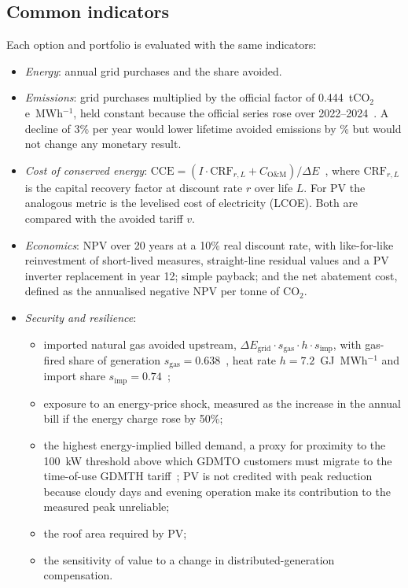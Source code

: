 \documentclass[processes,article,submit,pdftex,moreauthors]{Definitions/mdpi}
\begin{document}
\subsection{Common indicators}
\label{sec:indicators}
Each option and portfolio is evaluated with the same indicators:
\begin{itemize}
\item \emph{Energy}: annual grid purchases and the share avoided.
\item \emph{Emissions}: grid purchases multiplied by the official factor of 0.444~tCO$_2$e~MWh$^{-1}$, held constant because the official series rose over 2022--2024~\cite{cre2023fesen2022,cre2024fesen2023,semarnat2025fesen}. A decline of 3\% per year would lower lifetime avoided emissions by \nEFTrendDrop\% but would not change any monetary result.
\item \emph{Cost of conserved energy}: $\mathrm{CCE} = (I\cdot\mathrm{CRF}_{r,L} + C_{\mathrm{O\&M}})/\Delta E$~\cite{meier1982}, where $\mathrm{CRF}_{r,L}$ is the capital recovery factor at discount rate $r$ over life $L$. For PV the analogous metric is the levelised cost of electricity (LCOE). Both are compared with the avoided tariff $v$.
\item \emph{Economics}: NPV over 20 years at a 10\% real discount rate, with like-for-like reinvestment of short-lived measures, straight-line residual values and a PV inverter replacement in year 12; simple payback; and the net abatement cost, defined as the annualised negative NPV per tonne of CO$_2$.
\item \emph{Security and resilience}:
  \begin{itemize}
  \item imported natural gas avoided upstream, $\Delta E_{\mathrm{grid}}\cdot s_{\mathrm{gas}}\cdot h\cdot s_{\mathrm{imp}}$, with gas-fired share of generation $s_{\mathrm{gas}}=0.638$~\cite{sener2025plan}, heat rate $h=7.2$~GJ~MWh$^{-1}$ and import share $s_{\mathrm{imp}}=0.74$~\cite{eia2025mexico};
  \item exposure to an energy-price shock, measured as the increase in the annual bill if the energy charge rose by 50\%;
  \item the highest energy-implied billed demand, a proxy for proximity to the 100~kW threshold above which GDMTO customers must migrate to the time-of-use GDMTH tariff~\cite{cfe2026gdmto}; PV is not credited with peak reduction because cloudy days and evening operation make its contribution to the measured peak unreliable;
  \item the roof area required by PV;
  \item the sensitivity of value to a change in distributed-generation compensation.
  \end{itemize}
\end{itemize}
\end{document}
